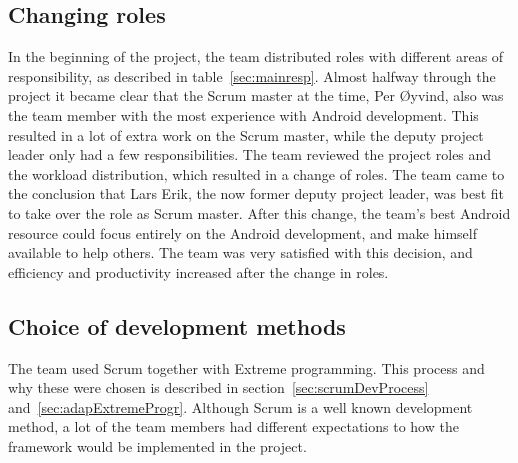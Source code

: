 \subsection{Changing roles}
\label{sec:unbalancedWorkload}
In the beginning of the project, the team distributed roles with different areas of responsibility, as described in table~\ref{sec:mainresp}. Almost halfway through the project it became clear that the Scrum master at the time, Per Øyvind, also was the team member with the most experience with Android development. This resulted in a lot of extra work on the Scrum master, while the deputy project leader only had a few responsibilities. The team reviewed the project roles and the workload distribution, which resulted in a change of roles. The team came to the conclusion that Lars Erik, the now former deputy project leader, was best fit to take over the role as Scrum master. After this change, the team's best Android resource could focus entirely on the Android development, and make himself available to help others. The team was very satisfied with this decision, and efficiency and productivity increased after the change in roles.


\subsection{Choice of development methods}

The team used Scrum together with Extreme programming. This process and why these were chosen is described in section~\ref{sec:scrumDevProcess} and~\ref{sec:adapExtremeProgr}. Although Scrum is a well known development method, a lot of the team members had different expectations to how the framework would be implemented in the project.

